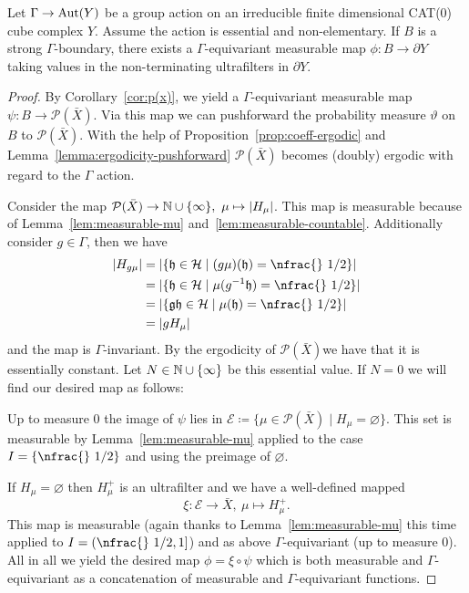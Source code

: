 \begin{thm}[{\cite[Theorem~4.1]{MR3509968}}]
  \label{thm:4.1}
  Let \(\Gamma \to \operatorname{Aut}(Y)\) be a group action on an irreducible finite dimensional CAT(0) cube complex \(Y\). Assume the action is essential and non-elementary. If \(B\) is a strong \(\Gamma\)-boundary, there exists a \(\Gamma\)-equivariant measurable map \(\phi\colon B \to \partial Y\) taking values in the non-terminating ultrafilters in \(\partial Y\).
\end{thm}

\begin{proof}
  By Corollary~\ref{cor:p(x)}, we yield a \(\Gamma\)-equivariant measurable map \(\psi\colon B \to \mathcal{P}(\bar X)\). Via this map we can pushforward the probability measure \(\vartheta\) on \(B\) to \(\mathcal{P}(\bar X)\). With the help of Proposition~\ref{prop:coeff-ergodic} and Lemma~\ref{lemma:ergodicity-pushforward} \(\mathcal{P}(\bar X)\) becomes (doubly) ergodic with regard to the \(\Gamma\) action.

  Consider the map \(\mathcal{P}(\bar X) \to \mathbb{N} \cup \{\infty\},\ \mu \mapsto |H_\mu|\). This map is measurable because of Lemma~\ref{lem:measurable-mu} and~\ref{lem:measurable-countable}. Additionally consider \(g \in \Gamma\), then we have
  \begin{align*}
    |H_{g\mu}|
    & = |\{\mathfrak{h} \in \mathcal{H} \mid (g\mu)(\mathfrak{h}) = \text{\nfrac{} 1/2}\}|\\
    & = |\{\mathfrak{h} \in \mathcal{H} \mid \mu(g^{-1} \mathfrak{h}) = \text{\nfrac{} 1/2}\}|\\
    & = |\{\mathfrak{gh} \in \mathcal{H} \mid \mu(\mathfrak{h}) = \text{\nfrac{} 1/2}\}|\\
    & = |g H_\mu|
  \end{align*}
  and the map is \(\Gamma\)-invariant. By the ergodicity of \(\mathcal{P}(\bar X)\)we have that it is essentially constant. Let \(N \in \mathbb{N} \cup \{\infty\}\) be this essential value. If \(N = 0\) we will find our desired map as follows:

  Up to measure 0 the image of \(\psi\) lies in \(\mathcal{E} \coloneqq \{ \mu \in \mathcal{P}(\bar X) \mid H_\mu = \varnothing\}\). This set is measurable by Lemma~\ref{lem:measurable-mu} applied to the case \(I = \{\text{\nfrac{} 1/2}\}\) and using the preimage of \(\varnothing\).

  If \(H_\mu = \varnothing\) then \(H_\mu^+\) is an ultrafilter and we have a well-defined mapped
  \[
    \xi\colon \mathcal{E} \to \bar X,\ \mu \mapsto H_\mu^+.
  \]
  This map is measurable (again thanks to Lemma~\ref{lem:measurable-mu} this time applied to \(I = (\text{\nfrac{} 1/2}, 1]\)) and as above \(\Gamma\)-equivariant (up to measure 0). All in all we yield the desired map \(\phi = \xi \circ \psi\) which is both measurable and \(\Gamma\)-equivariant as a concatenation of measurable and \(\Gamma\)-equivariant functions.


\end{proof}
